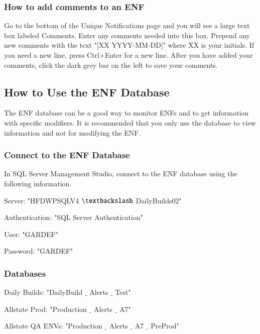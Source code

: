 \documentclass[a4paper,12pt]{report}
\begin{document}
\subsubsection*{How to add comments to an ENF}
 \par
Go to the bottom of the Unique Notifications page and you will see a large text box labeled Comments. Enter any comments needed into this box. Prepend any new comments with the text "[XX YYYY-MM-DD]" where XX is your initials. If you need a new line, press Ctrl+Enter for a new line. After you have added your comments, click the dark grey bar on the left to save your comments. \par
\subsection*{How to Use the ENF Database}
 \par
The ENF database can be a good way to monitor ENFs and to get information with specific modifiers. It is recommended that you only use the database to view information and not for modifying the ENF. \par
\subsubsection*{Connect to the ENF Database}
 \par
In SQL Server Management Studio, connect to the ENF database using the following information. \par
Server: "HFDWPSQLV4 $  \textbackslash  $ DailyBuilds02" \par
Authentication: "SQL Server Authentication" \par
User: "GARDEF" \par
Password: "GARDEF" \par
\subsubsection*{Databases}
 \par
Daily Builds: "DailyBuild $  \_  $ Alerts $  \_  $ Test" \par
Allstate Prod: "Production $  \_  $ Alerts $  \_  $ A7" \par
Allstate QA ENVs: "Production $  \_  $ Alerts $  \_  $ A7 $  \_  $ PreProd" \par
\end{document}
